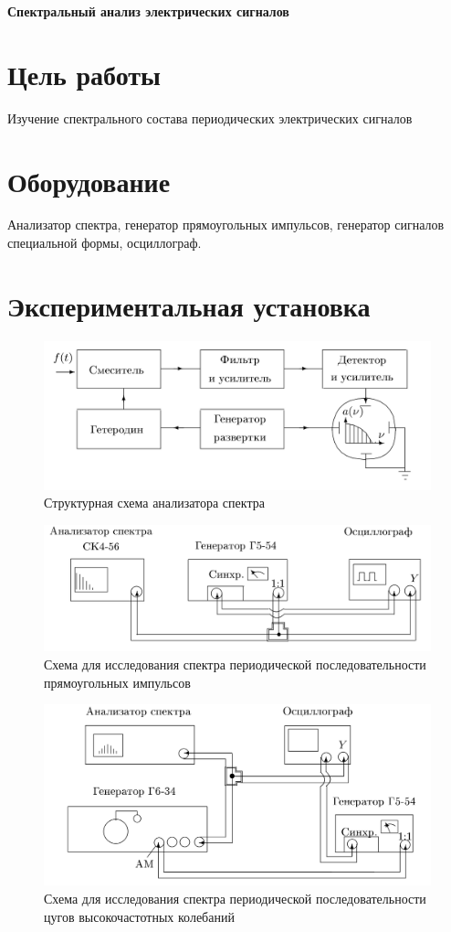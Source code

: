 \documentclass[a4paper, fontsize=14pt]{article}
\begin{document}



\huge
\centering
\textbf{Спектральный анализ электрических сигналов}

\raggedright
\large
\parindent=1cm
\section*{Цель работы}
Изучение спектрального состава периодических электрических сигналов
\section*{Оборудование}
Анализатор спектра, генератор прямоугольных импульсов, генератор сигналов специальной формы, осциллограф.
\section*{Экспериментальная установка}
\begin{figure}[H]
\center
\includegraphics[scale=0.2]{ust.png}
\caption{Структурная схема анализатора спектра}
\end{figure}
\begin{figure}[H]
\center
\includegraphics[scale=0.2]{ust1.png}
\caption{Схема для исследования спектра периодической последовательности прямоугольных импульсов}
\end{figure}
\begin{figure}[H]
\center
\includegraphics[scale=0.2]{ust2.png}
\caption{Схема для исследования спектра периодической последовательности цугов высокочастотных колебаний}
\end{figure}
\end{document}
